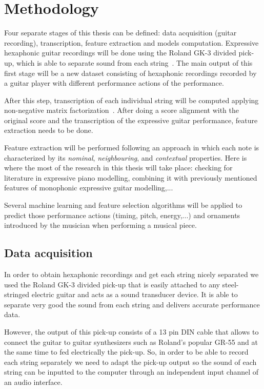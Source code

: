 \chapter{Methodology}
\label{chap:methods}
Four separate stages of this thesis can be defined: data acquisition (guitar recording), transcription, feature extraction and models computation. Expressive hexaphonic guitar recordings will be done using the Roland GK-3 divided pick-up, which is able to separate sound from each string~\cite{Angulo2016}. The main output of this first stage will be a new dataset consisting of hexaphonic recordings recorded by a guitar player with different performance actions of the performance. 

After this step, transcription of each individual string will be computed applying non-negative matrix factorization~\cite{OGrady2009}. After doing a score alignment with the original score and the transcription of the expressive guitar performance, feature extraction needs to be done.

Feature extraction will be performed following an approach in which each note is characterized by its \textit{nominal}, \textit{neighbouring}, and \textit{contextual} properties.  Here is where the most of the research in this thesis will take place:  checking for literature in expressive piano modelling, combining it with previously mentioned features of monophonic expressive guitar modelling,... 

Several machine learning and feature selection algorithms will be applied to predict those performance actions (timing, pitch, energy,...) and ornaments introduced by the musician when performing a musical piece.


\section{Data acquisition}
In order to obtain hexaphonic recordings and get each string nicely separated we used the Roland GK-3 divided pick-up that is easily attached to any steel-stringed electric guitar and acts as a sound transducer device. It is able to separate very good the sound from each string and delivers accurate performance data.

However, the output of this pick-up consists of a 13 pin DIN cable that allows to connect the guitar to guitar synthesizers such as Roland's popular GR-55 and at the same time to fed electrically the pick-up. So, in order to be able to record each string separately we need to adapt the pick-up output so the sound of each string can be inputted to the computer through an independent input channel of an audio interface.

